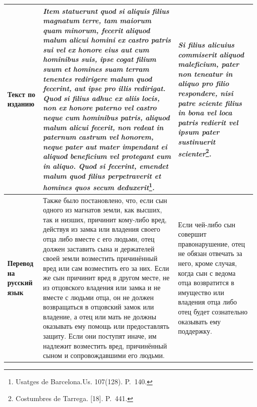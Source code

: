 \begin{center}
\begin{longtable}{|p{}|p{}|p{}|}
\textbf{Текст по изданию} & \emph{Item}\emph{ }\emph{statuerunt}\emph{ }\emph{quod}\emph{ }\emph{si}\emph{ }\emph{aliquis}\emph{ }\emph{filius}\emph{ }\emph{magnatum}\emph{ }\emph{terre}\emph{, }\emph{tam}\emph{ }\emph{maiorum}\emph{ }\emph{quam}\emph{ }\emph{minorum}\emph{, }\emph{fecerit}\emph{ }\emph{aliquod}\emph{ }\emph{malum}\emph{ }\emph{alicui}\emph{ }\emph{homini}\emph{ }\emph{ex}\emph{ }\emph{castro}\emph{ }\emph{patris}\emph{ }\emph{sui}\emph{ }\emph{vel}\emph{ }\emph{ex}\emph{ }\emph{honore}\emph{ }\emph{eius}\emph{ }\emph{aut}\emph{ }\emph{cum}\emph{ }\emph{hominibus}\emph{ }\emph{suis}\emph{, }\emph{ipse}\emph{ }\emph{cogat}\emph{ }\emph{filium}\emph{ }\emph{suum}\emph{ }\emph{et}\emph{ }\emph{homines}\emph{ }\emph{suam}\emph{ }\emph{terram}\emph{ }\emph{tenentes}\emph{ }\emph{redirigere}\emph{ }\emph{malum}\emph{ }\emph{quod}\emph{ }\emph{fecerint}\emph{, }\emph{aut}\emph{ }\emph{ipse}\emph{ }\emph{pro}\emph{ }\emph{illis}\emph{ }\emph{redirigat}\emph{. }\emph{Quod}\emph{ }\emph{si}\emph{ }\emph{filius}\emph{ }\emph{adhuc}\emph{ }\emph{ex}\emph{ }\emph{aliis}\emph{ }\emph{locis}\emph{, }\emph{non}\emph{ }\emph{ex}\emph{ }\emph{honore}\emph{ }\emph{paterno}\emph{ }\emph{vel}\emph{ }\emph{castro}\emph{ }\emph{neque}\emph{ }\emph{cum}\emph{ }\emph{hominibus}\emph{ }\emph{patris}\emph{, }\emph{aliquod}\emph{ }\emph{malum}\emph{ }\emph{alicui}\emph{ }\emph{fecerit}\emph{, }\emph{non}\emph{ }\emph{redeat}\emph{ in }\emph{paternum}\emph{ }\emph{castrum}\emph{ }\emph{vel}\emph{ }\emph{honorem}\emph{, }\emph{neque}\emph{ }\emph{pater}\emph{ }\emph{aut}\emph{ }\emph{mater}\emph{ }\emph{impendant}\emph{ }\emph{ei}\emph{ }\emph{aliquod}\emph{ }\emph{beneficium}\emph{ }\emph{vel}\emph{ }\emph{protegant}\emph{ }\emph{eum}\emph{ in }\emph{aliquo}\emph{. }\emph{Quod si fecerint, emendet malum quod filius perpetraverit et homines quos secum deduxerit}\footnote{Usatges de Barcelona.Us. 107(128). P.~140.}\emph{.} & \emph{Si filius alicuius commiserit aliquod maleficium, pater non teneatur in aliquo pro filio respondere, nisi patre sciente filius in bona vel loca patris redierit vel ipsum pater sustinuerit scienter}\footnote{Costumbres de Tarrega. [18]. P.~441.}\emph{.} \\ \hline
\textbf{Перевод на }\textbf{русский язык} & Также было постановлено, что, если сын одного из магнатов земли, как высших, так и низших, причинит кому-либо вред, действуя из замка или владения своего отца либо вместе с его людьми, отец должен заставить сына и держателей своей земли возместить причинённый вред или сам возместить его за них. Если же сын причинит вред в другом месте, не из отцовского владения или замка и не вместе с людьми отца, он не должен возвращаться в отцовский замок или владение, а отец или мать не должны оказывать ему помощь или предоставлять защиту. Если они поступят иначе, им надлежит возместить вред, причинённый сыном и сопровождавшими его людьми. & Если чей-либо сын совершит правонарушение, отец не обязан отвечать за него, кроме случая, когда сын с ведома отца возвратится в имущество или владения отца либо отец будет сознательно оказывать ему поддержку. \\ \hline

\end{longtable}
\end{center}
